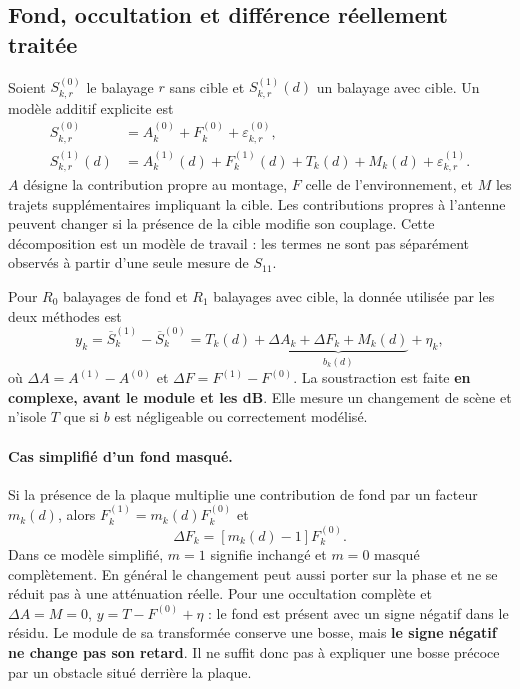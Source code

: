 \documentclass[11pt,a4paper]{article}
\begin{document}
\subsection{Fond, occultation et différence réellement traitée}

Soient $S^{(0)}_{k,r}$ le balayage $r$ sans cible et $S^{(1)}_{k,r}(d)$
un balayage avec cible. Un modèle additif explicite est
\begin{align}
 S^{(0)}_{k,r} &= A^{(0)}_k+F^{(0)}_k+\varepsilon^{(0)}_{k,r},\\
 S^{(1)}_{k,r}(d) &= A^{(1)}_k(d)+F^{(1)}_k(d)
                    +T_k(d)+M_k(d)+\varepsilon^{(1)}_{k,r}.
\end{align}
$A$ désigne la contribution propre au montage, $F$ celle de l'environnement,
et $M$ les trajets supplémentaires impliquant la cible. Les contributions
propres à l'antenne peuvent changer si la présence de la cible modifie son
couplage. Cette décomposition est un modèle de travail : les termes ne sont
pas séparément observés à partir d'une seule mesure de $S_{11}$.

Pour $R_0$ balayages de fond et $R_1$ balayages avec cible, la donnée utilisée
par les deux méthodes est
\begin{equation}\label{eq:cible-difference}
 \boxed{y_k=\overline S^{(1)}_k-\overline S^{(0)}_k
 =T_k(d)+\underbrace{\Delta A_k+\Delta F_k+M_k(d)}_{b_k(d)}+\eta_k,}
\end{equation}
où $\Delta A=A^{(1)}-A^{(0)}$ et $\Delta F=F^{(1)}-F^{(0)}$.
La soustraction est faite \textbf{en complexe, avant le module et les dB}.
Elle mesure un changement de scène et n'isole $T$ que si $b$ est négligeable
ou correctement modélisé.

\paragraph{Cas simplifié d'un fond masqué.}
Si la présence de la plaque multiplie une contribution de fond par un facteur
$m_k(d)$, alors $F^{(1)}_k=m_k(d)F^{(0)}_k$ et
\begin{equation}
 \Delta F_k=[m_k(d)-1]F^{(0)}_k.
\end{equation}
Dans ce modèle simplifié, $m=1$ signifie inchangé et $m=0$ masqué complètement.
En général le changement peut aussi porter sur la phase et ne se réduit pas
à une atténuation réelle. Pour une occultation complète et $\Delta A=M=0$,
$y=T-F^{(0)}+\eta$ : le fond est présent avec un signe négatif dans le résidu.
Le module de sa transformée conserve une bosse, mais \textbf{le signe négatif
ne change pas son retard}. Il ne suffit donc pas à expliquer une bosse précoce
par un obstacle situé derrière la plaque.
\end{document}
